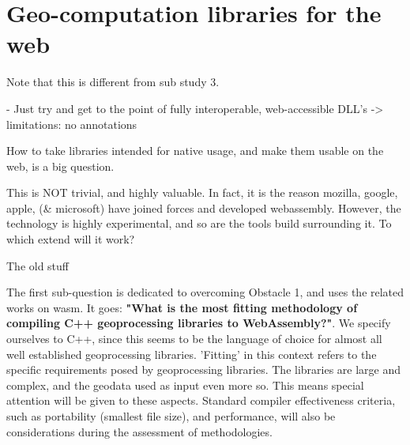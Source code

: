 \section{Geo-computation libraries for the web}
\label{sec:method-one}

\begin{note}
  Note that this is different from sub study 3.
 
  - Just try and get to the point of fully interoperable, web-accessible DLL's
    -> limitations: no annotations 

\end{note}
\mySubRQOne

How to take libraries intended for native usage, and make them usable on the web, is a big question. 

This is NOT trivial, and highly valuable.  In fact, it is the reason mozilla, google, apple, (\& microsoft) have joined forces and developed webassembly. However, the technology is highly experimental, and so are the tools build surrounding it. To which extend will it work?



\begin{note}
  The old stuff
\end{note}

The first sub-question is dedicated to overcoming Obstacle 1, and uses the related works on \ac{wasm}. It goes: \textbf{"What is the most fitting methodology of compiling C++ geoprocessing libraries to WebAssembly?"}.
We specify ourselves to C++, since this seems to be the language of choice for almost all well established geoprocessing libraries. 
'Fitting' in this context refers to the specific requirements posed by geoprocessing libraries. 
The libraries are large and complex, and the geodata used as input even more so. 
This means special attention will be given to these aspects. 
Standard compiler effectiveness criteria, such as portability (smallest file size), and performance, will also be considerations during the assessment of methodologies.  

